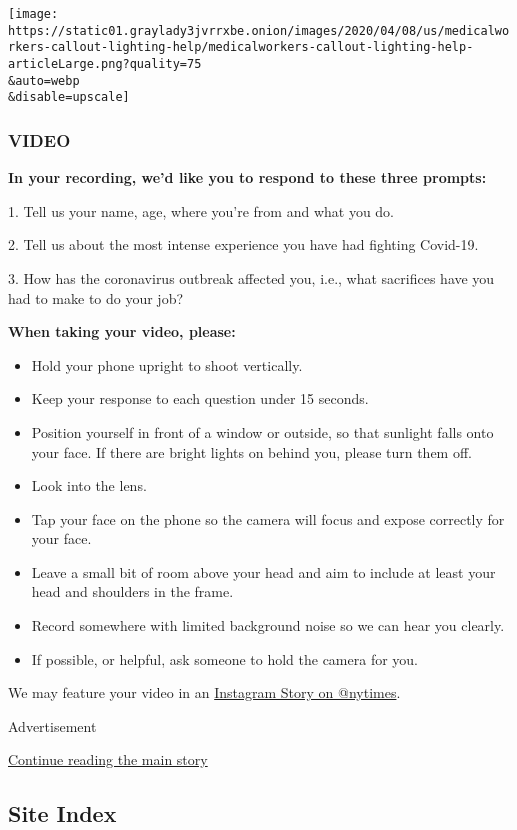 \texttt{[image: https://static01.graylady3jvrrxbe.onion/images/2020/04/08/us/medicalworkers-callout-lighting-help/medicalworkers-callout-lighting-help-articleLarge.png?quality=75\\\&auto=webp\\\&disable=upscale]}

\hypertarget{video}{%
\subsubsection{VIDEO}\label{video}}

\textbf{In your recording, we'd like you to respond to these three
prompts:}

1. Tell us your name, age, where you're from and what you do.

2. Tell us about the most intense experience you have had fighting
Covid-19.

3. How has the coronavirus outbreak affected you, i.e., what sacrifices
have you had to make to do your job?

\textbf{When taking your video, please:}

\begin{itemize}
\item
  Hold your phone upright to shoot vertically.
\item
  Keep your response to each question under 15 seconds.
\item
  Position yourself in front of a window or outside, so that sunlight
  falls onto your face. If there are bright lights on behind you, please
  turn them off.
\item
  Look into the lens.
\item
  Tap your face on the phone so the camera will focus and expose
  correctly for your face.
\item
  Leave a small bit of room above your head and aim to include at least
  your head and shoulders in the frame.
\item
  Record somewhere with limited background noise so we can hear you
  clearly.
\item
  If possible, or helpful, ask someone to hold the camera for you.
\end{itemize}

We may feature your video in an
\href{https://www.instagram.com/nytimes/}{Instagram Story on @nytimes}.

Advertisement

\protect\hyperlink{after-bottom}{Continue reading the main story}

\hypertarget{site-index}{%
\subsection{Site Index}\label{site-index}}

